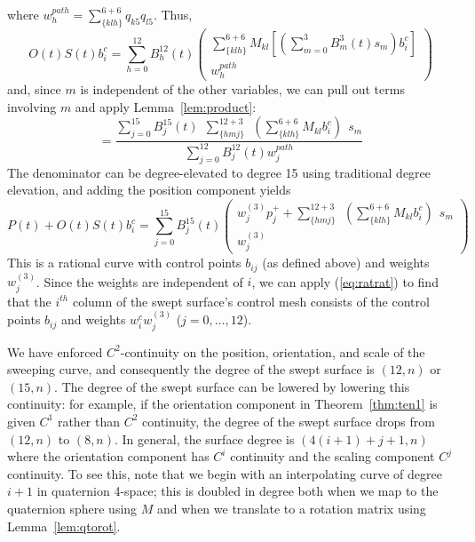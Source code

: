 where $w_h^{path} = \sum_{\{klh\}}^{6+6} q_{k5} q_{l5}$.
Thus,
\[
O(t)S(t)b_i^c = 
	\sum_{h=0}^{12} B_h^{12}(t) 
	\left(	\begin{array}{c}
	\sum_{\{klh\}}^{6+6} M_{kl} [(\sum_{m=0}^3 B_m^3(t) s_m) b_i^c] \\
	w_h^{path}
	\end{array} \right)
\]
and, since $m$ is independent of the other variables, 
we can pull out terms involving $m$ and apply Lemma~\ref{lem:product}:
\[
= \frac{\sum_{j=0}^{15} B_j^{15}(t) \ \ \sum_{\{hmj\}}^{12+3} \ \ 
		(\sum_{\{klh\}}^{6+6} M_{kl} b_i^c) \ \ s_m}
     {\sum_{j=0}^{12} B_j^{12}(t) w_j^{path}}
\]
The denominator can be degree-elevated to degree 15 using 
traditional degree elevation,
and adding the position component yields
\[
P(t) + O(t)S(t)b_i^c = 
\sum_{j=0}^{15} B_j^{15}(t) 
	\left(	\begin{array}{c}
	w^{(3)}_j p_j^{+} + 
	\sum_{\{hmj\}}^{12+3} \ \ 
		(\sum_{\{klh\}}^{6+6} M_{kl} b_i^c) \ \ s_m
	\\ w^{(3)}_j
	\end{array} \right)
\]
This is a rational curve with control points $b_{ij}$
(as defined above) and weights $w^{(3)}_j$.
Since the weights are independent of $i$, we can apply (\ref{eq:ratrat})
to find that the $i^{th}$ column of the swept surface's control mesh
consists of the control points $b_{ij}$ and weights 
$w_i^c  w^{(3)}_j$ ($j=0,\ldots,12$).
\QED

We have enforced $C^2$-continuity on the position, orientation,
and scale of the sweeping curve, and consequently the degree of the
swept surface is $(12,n)$ or $(15,n)$.
The degree of the swept surface can be lowered by lowering this continuity:
for example, if the orientation component
in Theorem~\ref{thm:ten1} is given $C^1$ rather than $C^2$ continuity, 
the degree of the swept surface drops from $(12,n)$ to $(8,n)$.
In general, the surface degree is $(4(i+1)+j+1,n)$ where the orientation
component has $C^i$ continuity and the scaling component $C^j$ continuity.
To see this, note that we begin with an interpolating curve of degree $i+1$
in quaternion 4-space; this is doubled in degree both when we map to the 
quaternion sphere using $M$ and when we translate to a rotation matrix
using Lemma~\ref{lem:qtorot}.

